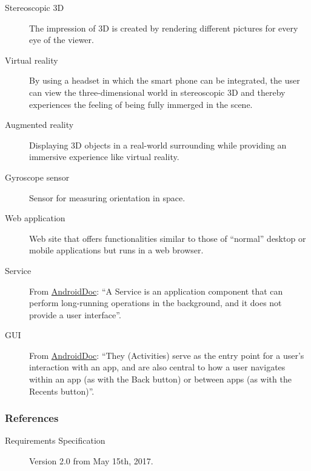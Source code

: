 \begin{description}
	\item[Stereoscopic 3D] The impression of 3D is created by rendering different pictures for every eye of the viewer.
	\item[Virtual reality] By using a headset in which the smart phone can be integrated, the user can view the three-dimensional world in stereoscopic 3D and thereby experiences the feeling of being fully immerged in the scene.
	\item[Augmented reality] Displaying 3D objects in a real-world surrounding while providing an immersive experience like virtual reality.
	\item[Gyroscope sensor] Sensor for measuring orientation in space.
	\item[Web application] Web site that offers functionalities similar to those of ``normal'' desktop or mobile applications but runs in a web browser.
	\item[Service] From \href{https://developer.android.com/guide/components/services.html}{AndroidDoc}: ``A Service is an application component that can perform long-running operations in the background, and it does not provide a user interface''.
	\item[GUI] From \href{https://developer.android.com/guide/components/activities.html}{AndroidDoc}: ``They (Activities) serve as the entry point for a user's interaction with an app, and are also central to how a user navigates within an app (as with the Back button) or between apps (as with the Recents button)''.
\end{description}


\subsubsection{References}

\begin{description}
	\item[Requirements Specification] Version 2.0 from May 15th, 2017.
\end{description}
